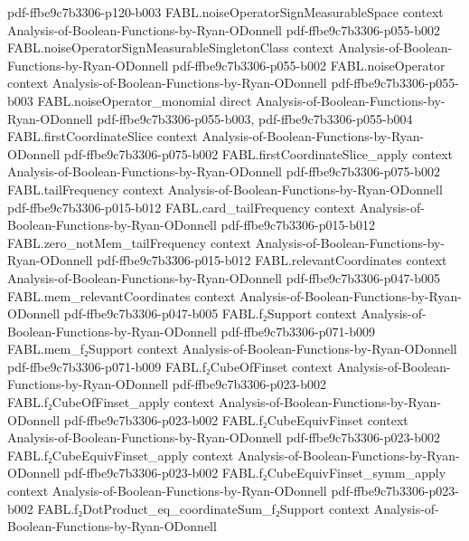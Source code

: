\begin{theorem}
  {pdf-ffbe9c7b3306-p120-b003}
\proofstep
  {FABL.noiseOperatorSignMeasurableSpace}
  {context}
  {Analysis-of-Boolean-Functions-by-Ryan-ODonnell}
  {pdf-ffbe9c7b3306-p055-b002}
\proofstep
  {FABL.noiseOperatorSignMeasurableSingletonClass}
  {context}
  {Analysis-of-Boolean-Functions-by-Ryan-ODonnell}
  {pdf-ffbe9c7b3306-p055-b002}
\proofstep
  {FABL.noiseOperator}
  {context}
  {Analysis-of-Boolean-Functions-by-Ryan-ODonnell}
  {pdf-ffbe9c7b3306-p055-b003}
\proofstep
  {FABL.noiseOperator_monomial}
  {direct}
  {Analysis-of-Boolean-Functions-by-Ryan-ODonnell}
  {pdf-ffbe9c7b3306-p055-b003,
    pdf-ffbe9c7b3306-p055-b004}
\proofstep
  {FABL.firstCoordinateSlice}
  {context}
  {Analysis-of-Boolean-Functions-by-Ryan-ODonnell}
  {pdf-ffbe9c7b3306-p075-b002}
\proofstep
  {FABL.firstCoordinateSlice_apply}
  {context}
  {Analysis-of-Boolean-Functions-by-Ryan-ODonnell}
  {pdf-ffbe9c7b3306-p075-b002}
\proofstep
  {FABL.tailFrequency}
  {context}
  {Analysis-of-Boolean-Functions-by-Ryan-ODonnell}
  {pdf-ffbe9c7b3306-p015-b012}
\proofstep
  {FABL.card_tailFrequency}
  {context}
  {Analysis-of-Boolean-Functions-by-Ryan-ODonnell}
  {pdf-ffbe9c7b3306-p015-b012}
\proofstep
  {FABL.zero_notMem_tailFrequency}
  {context}
  {Analysis-of-Boolean-Functions-by-Ryan-ODonnell}
  {pdf-ffbe9c7b3306-p015-b012}
\proofstep
  {FABL.relevantCoordinates}
  {context}
  {Analysis-of-Boolean-Functions-by-Ryan-ODonnell}
  {pdf-ffbe9c7b3306-p047-b005}
\proofstep
  {FABL.mem_relevantCoordinates}
  {context}
  {Analysis-of-Boolean-Functions-by-Ryan-ODonnell}
  {pdf-ffbe9c7b3306-p047-b005}
\proofstep
  {FABL.f₂Support}
  {context}
  {Analysis-of-Boolean-Functions-by-Ryan-ODonnell}
  {pdf-ffbe9c7b3306-p071-b009}
\proofstep
  {FABL.mem_f₂Support}
  {context}
  {Analysis-of-Boolean-Functions-by-Ryan-ODonnell}
  {pdf-ffbe9c7b3306-p071-b009}
\proofstep
  {FABL.f₂CubeOfFinset}
  {context}
  {Analysis-of-Boolean-Functions-by-Ryan-ODonnell}
  {pdf-ffbe9c7b3306-p023-b002}
\proofstep
  {FABL.f₂CubeOfFinset_apply}
  {context}
  {Analysis-of-Boolean-Functions-by-Ryan-ODonnell}
  {pdf-ffbe9c7b3306-p023-b002}
\proofstep
  {FABL.f₂CubeEquivFinset}
  {context}
  {Analysis-of-Boolean-Functions-by-Ryan-ODonnell}
  {pdf-ffbe9c7b3306-p023-b002}
\proofstep
  {FABL.f₂CubeEquivFinset_apply}
  {context}
  {Analysis-of-Boolean-Functions-by-Ryan-ODonnell}
  {pdf-ffbe9c7b3306-p023-b002}
\proofstep
  {FABL.f₂CubeEquivFinset_symm_apply}
  {context}
  {Analysis-of-Boolean-Functions-by-Ryan-ODonnell}
  {pdf-ffbe9c7b3306-p023-b002}
\proofstep
  {FABL.f₂DotProduct_eq_coordinateSum_f₂Support}
  {context}
  {Analysis-of-Boolean-Functions-by-Ryan-ODonnell}

\end{theorem}
